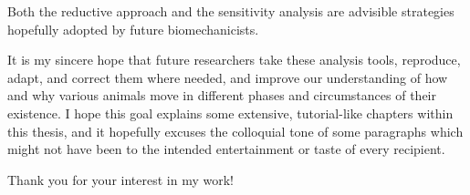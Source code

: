 Both the reductive approach and the sensitivity analysis are advisible strategies hopefully adopted by future biomechanicists.


It is my sincere hope that future researchers take these analysis tools, reproduce, adapt, and correct them where needed, and improve our understanding of how and why various animals move in different phases and circumstances of their existence.
I hope this goal explains some extensive, tutorial-like chapters within this thesis, and it hopefully excuses the colloquial tone of some paragraphs which might not have been to the intended entertainment or taste of every recipient.

Thank you for your interest in my work!
